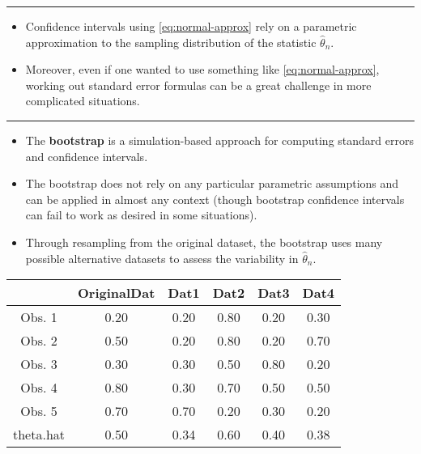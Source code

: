 \documentclass[]{book}
\begin{document}
\begin{center}\rule{0.5\linewidth}{\linethickness}\end{center}

\begin{itemize}
\item
  Confidence intervals using \eqref{eq:normal-approx} rely on a parametric approximation to the
  sampling distribution of the statistic \(\hat{\theta}_{n}\).
\item
  Moreover, even if one wanted to use something like \eqref{eq:normal-approx}, working out
  standard error formulas can be a great challenge in more complicated situations.
\end{itemize}

\begin{center}\rule{0.5\linewidth}{\linethickness}\end{center}

\begin{itemize}
\item
  The \textbf{bootstrap} is a simulation-based approach for computing standard errors and
  confidence intervals.
\item
  The bootstrap does not rely on any particular parametric assumptions and
  can be applied in almost any context
  (though bootstrap confidence intervals can fail to work as desired in some situations).
\item
  Through resampling from the original dataset, the bootstrap uses many possible alternative datasets to
  assess the variability in \(\hat{\theta}_{n}\).
\end{itemize}

\begin{table}[ht]
\centering
\begin{tabular}{cccccc}
  \hline
 & OriginalDat & Dat1 & Dat2 & Dat3 & Dat4 \\ 
  \hline
Obs. 1 & 0.20 & 0.20 & 0.80 & 0.20 & 0.30 \\ 
  Obs. 2 & 0.50 & 0.20 & 0.80 & 0.20 & 0.70 \\ 
  Obs. 3 & 0.30 & 0.30 & 0.50 & 0.80 & 0.20 \\ 
  Obs. 4 & 0.80 & 0.30 & 0.70 & 0.50 & 0.50 \\ 
  Obs. 5 & 0.70 & 0.70 & 0.20 & 0.30 & 0.20 \\ 
  theta.hat & 0.50 & 0.34 & 0.60 & 0.40 & 0.38 \\ 
   \hline
\end{tabular}
\end{table}
\end{document}
